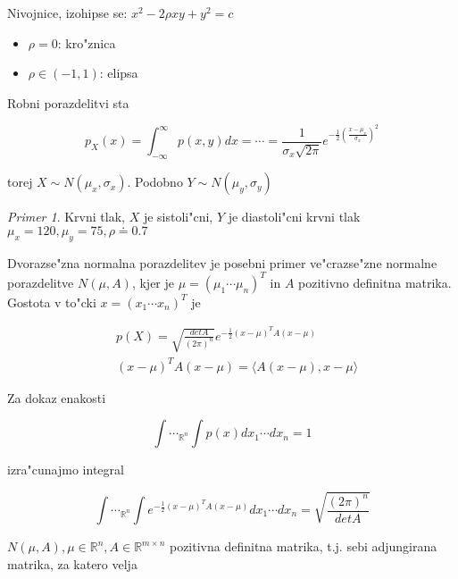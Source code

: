 \documentclass[a4paper,12pt]{article}
\theoremstyle{definition}
\theoremstyle{remark}
\newtheorem*{ex}{Primer}
\newcommand{\R}{\mathbb{R}}
\begin{document}
Nivojnice, izohipse se: $x^2 - 2 \rho x y + y^2 = c$

\begin{itemize}
    \item $\rho = 0$: kro"znica
    \item $\rho \in (-1,1)$: elipsa
\end{itemize}

Robni porazdelitvi sta

\begin{equation*}
    p_X(x) = \int_{-\infty}^{\infty} p(x,y) dx = \cdots = \frac{1}{\sigma_x \sqrt{2\pi}}
    e^{-\frac{1}{2} (\frac{x-\mu_x}{\sigma_x})^2}
\end{equation*}

torej $X \sim N(\mu_x, \sigma_x)$. Podobno $Y \sim N(\mu_y, \sigma_y)$

\begin{ex}
    Krvni tlak, $X$ je sistoli"cni, $Y$ je diastoli"cni krvni tlak \\
    $\mu_x = 120, \mu_y = 75, \rho \doteq 0.7$
\end{ex}

Dvorazse"zna normalna porazdelitev je posebni primer ve"crazse"zne normalne porazdelitve $N(\mu, A)$, kjer je
$\mu = (\mu_1 \cdots \mu_n)^T$ in $A$ pozitivno definitna matrika. \\
Gostota v to"cki $x = (x_1 \cdots x_n)^T$ je

\begin{align*}
    &p(X) = \sqrt{\frac{det A}{(2\pi)^n}} e^{-\frac{1}{2} (x-\mu)^T A (x-\mu)} \\
    &(x-\mu)^T A (x-\mu) = \langle A(x-\mu), x-\mu \rangle
\end{align*}

Za dokaz enakosti

\begin{equation*}
    \int \cdots_{\R^n} \int p(x) dx_1 \cdots dx_n = 1
\end{equation*}

izra"cunajmo integral

\begin{equation*}
    \int \cdots_{\R^n} \int e^{-\frac{1}{2} (x-\mu)^T A (x-\mu)} dx_1 \cdots dx_n =
    \sqrt{\frac{(2\pi)^n}{det A}}
\end{equation*}




$N(\mu, A), \mu \in \R^n, A \in \R^{m \times n}$ pozitivna definitna matrika, t.j. sebi adjungirana matrika,
za katero velja
\end{document}
